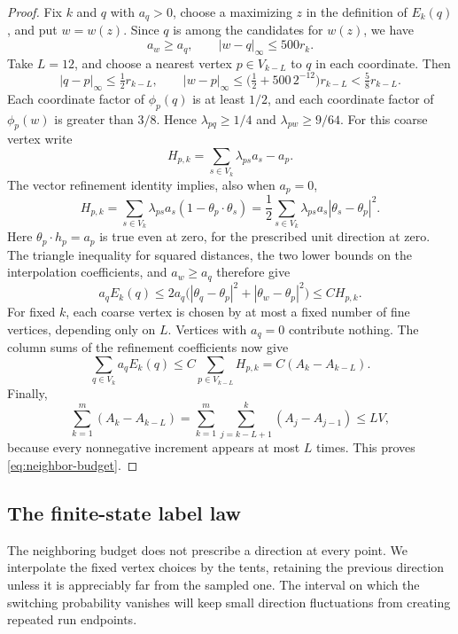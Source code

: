 \begin{proof}
Fix $k$ and $q$ with $a_q>0$, choose a maximizing $z$ in the definition
of $E_k(q)$, and put $w=w(z)$. Since $q$ is among the candidates for
$w(z)$, we have
\[
 a_w\ge a_q,
 \qquad |w-q|_{\infty}\le500r_k.
\]
Take $L=12$, and choose a nearest vertex $p\in V_{k-L}$ to $q$ in each
coordinate. Then
\[
 |q-p|_{\infty}\le\tfrac12r_{k-L},
 \qquad
 |w-p|_{\infty}
 \le\bigl(\tfrac12+500\,2^{-12}\bigr)r_{k-L}
 <\tfrac58r_{k-L}.
\]
Each coordinate factor of $\phi_p(q)$ is at least $1/2$, and each
coordinate factor of $\phi_p(w)$ is greater than $3/8$. Hence
$\lambda_{pq}\ge1/4$ and $\lambda_{pw}\ge9/64$.
For this coarse vertex write
\[
 H_{p,k}=\sum_{s\in V_k}\lambda_{ps}a_s-a_p.
\]
The vector refinement identity implies, also when $a_p=0$,
\begin{equation}
 H_{p,k}
 =\sum_{s\in V_k}\lambda_{ps}a_s
                  (1-\theta_p\cdot\theta_s)
 =\frac12\sum_{s\in V_k}\lambda_{ps}a_s
                  |\theta_s-\theta_p|^2.
 \label{eq:labels-neighbor-defect}
\end{equation}
Here $\theta_p\cdot h_p=a_p$ is true even at zero, for the prescribed
unit direction at zero. The triangle inequality for squared distances,
the two lower bounds on the interpolation coefficients, and $a_w\ge a_q$
therefore give
\[
 a_q E_k(q)
 \le2a_q\bigl(|\theta_q-\theta_p|^2
                    +|\theta_w-\theta_p|^2\bigr)
 \le C H_{p,k}.
\]
For fixed $k$, each coarse vertex is chosen by at most a fixed number
of fine vertices, depending only on $L$. Vertices with $a_q=0$ contribute
nothing. The column sums of the refinement coefficients now give
\[
 \sum_{q\in V_k}a_q E_k(q)
 \le C\sum_{p\in V_{k-L}}H_{p,k}
 =C(A_k-A_{k-L}).
\]
Finally,
\[
 \sum_{k=1}^m(A_k-A_{k-L})
 =\sum_{k=1}^m\sum_{j=k-L+1}^k(A_j-A_{j-1})
 \le L V,
\]
because every nonnegative increment appears at most $L$ times. This proves
\eqref{eq:neighbor-budget}.
\end{proof}

\subsection{The finite-state label law}

The neighboring budget does not prescribe a direction at every point.
We interpolate the fixed vertex choices by the tents, retaining the
previous direction unless it is appreciably far from the sampled one.
The interval on which the switching probability vanishes will keep
small direction fluctuations from creating repeated run endpoints.

